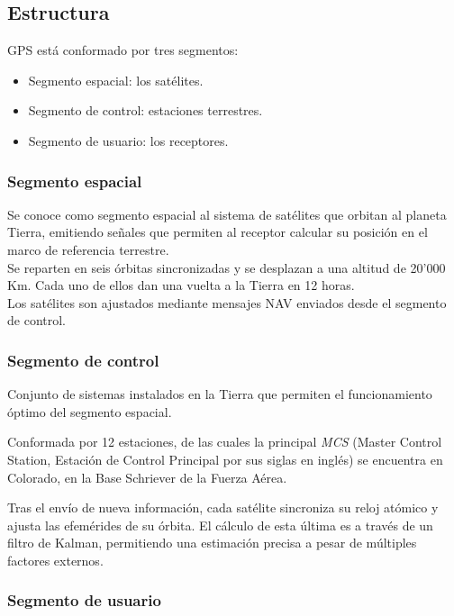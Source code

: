 \subsection{Estructura}

GPS está conformado por tres segmentos:

\begin{itemize}
	\item Segmento espacial: los satélites.
	\item Segmento de control: estaciones terrestres.
	\item Segmento de usuario: los receptores.
\end{itemize}
	
\subsubsection{Segmento espacial}

Se conoce como segmento espacial al sistema de satélites que orbitan al planeta Tierra, emitiendo señales que permiten al receptor calcular su posición en el marco de referencia terrestre. \\

Se reparten en seis órbitas sincronizadas y se desplazan a una altitud de 20'000 Km. Cada uno de ellos dan una vuelta a la Tierra en 12 horas. \\

Los satélites son ajustados mediante mensajes NAV enviados desde el segmento de control.

\subsubsection{Segmento de control}

Conjunto de sistemas instalados en la Tierra que permiten el funcionamiento óptimo del segmento espacial.

Conformada por 12 estaciones, de las cuales la principal \textit{MCS} (Master Control Station, Estación de Control Principal por sus siglas en inglés) se encuentra en Colorado, en la Base Schriever de la Fuerza Aérea.	

Tras el envío de nueva información, cada satélite sincroniza su reloj atómico y ajusta las efemérides de su órbita. El cálculo de esta última es a través de un filtro de Kalman, permitiendo una estimación precisa a pesar de múltiples factores externos.

\subsubsection{Segmento de usuario}


